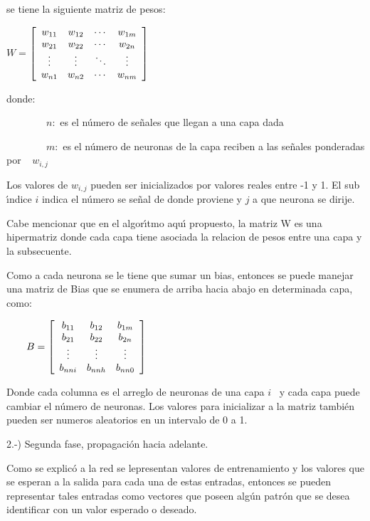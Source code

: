 se tiene la siguiente matriz de pesos:

\begin{center}
\qquad$W=$\bigskip$\left[
\begin{array}
[c]{cccc}%
w_{11} & w_{12} & \cdots & w_{1m}\\
w_{21} & w_{22} & \cdots & w_{2n}\\
\vdots & \vdots & \ddots & \vdots\\
w_{n1} & w_{n2} & \cdots & w_{nm}%
\end{array}
\right]  $
\end{center}

donde:

\bigskip$\qquad\qquad n:$ es el n\'{u}mero de se\~{n}ales que llegan a una
capa dada

$\qquad\qquad m:$ es el n\'{u}mero de neuronas de la capa reciben a las
se\~{n}ales ponderadas por$\ \ \ \ \ w_{i,j}$

Los valores de $w_{i,j}$ pueden ser inicializados por valores reales entre -1
y 1. El sub \'{\i}ndice $i$ indica el n\'{u}mero se se\~{n}al de donde
proviene y $j$ a que neurona se dirije.

Cabe mencionar que en el algor\'{\i}tmo aqu\'{\i} propuesto, la matriz W es
una hipermatriz donde cada capa tiene asociada la relacion de pesos entre una
capa y la subsecuente.

Como a cada neurona se le tiene que sumar un bias, entonces se puede manejar
una matriz de Bias que se enumera de arriba hacia abajo en determinada capa, como:

\begin{center}
$\qquad B=\left[
\begin{array}
[c]{ccc}%
b_{11} & b_{12} & b_{1m}\\
b_{21} & b_{22} & b_{2n}\\
\vdots & \vdots & \vdots\\
b_{nni} & b_{nnh} & b_{nn0}%
\end{array}
\right]  $
\end{center}

Donde cada columna es el arreglo de neuronas de una capa $i$ \ y cada capa
puede cambiar el n\'{u}mero de neuronas. Los valores para inicializar a la
matriz tambi\'{e}n pueden ser numeros aleatorios en un intervalo de 0 a 1.

2.-) Segunda fase, propagaci\'{o}n hacia adelante.

Como se explic\'{o} a la red se lepresentan valores de entrenamiento y los
valores que se esperan a la salida para cada una de estas entradas, entonces
se pueden representar tales entradas como vectores que poseen alg\'{u}n
patr\'{o}n que se desea identificar con un valor esperado o deseado.

